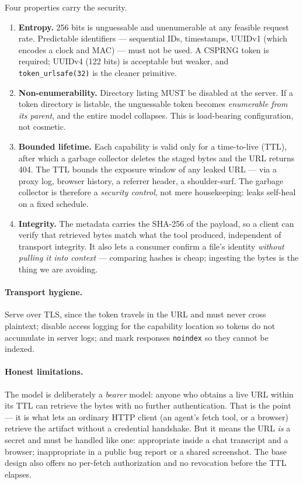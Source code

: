 \documentclass[11pt]{article}
\begin{document}
Four properties carry the security.
\begin{enumerate}
\item \textbf{Entropy.} 256 bits is unguessable and unenumerable at any feasible request rate. Predictable identifiers --- sequential IDs, timestamps, UUIDv1 (which encodes a clock and MAC) --- must not be used. A CSPRNG token is required; UUIDv4 (122 bits) is acceptable but weaker, and \texttt{token\_urlsafe(32)} is the cleaner primitive.
\item \textbf{Non-enumerability.} Directory listing MUST be disabled at the server. If a token directory is listable, the unguessable token becomes \emph{enumerable from its parent}, and the entire model collapses. This is load-bearing configuration, not cosmetic.
\item \textbf{Bounded lifetime.} Each capability is valid only for a time-to-live (TTL), after which a garbage collector deletes the staged bytes and the URL returns 404. The TTL bounds the exposure window of any leaked URL --- via a proxy log, browser history, a referrer header, a shoulder-surf. The garbage collector is therefore a \emph{security control}, not mere housekeeping: leaks self-heal on a fixed schedule.
\item \textbf{Integrity.} The metadata carries the SHA-256 of the payload, so a client can verify that retrieved bytes match what the tool produced, independent of transport integrity. It also lets a consumer confirm a file's identity \emph{without pulling it into context} --- comparing hashes is cheap; ingesting the bytes is the thing we are avoiding.
\end{enumerate}

\paragraph{Transport hygiene.} Serve over TLS, since the token travels in the URL and must never cross plaintext; disable access logging for the capability location so tokens do not accumulate in server logs; and mark responses \texttt{noindex} so they cannot be indexed.

\paragraph{Honest limitations.} The model is deliberately a \emph{bearer} model: anyone who obtains a live URL within its TTL can retrieve the bytes with no further authentication. That is the point --- it is what lets an ordinary HTTP client (an agent's fetch tool, or a browser) retrieve the artifact without a credential handshake. But it means the URL \emph{is} a secret and must be handled like one: appropriate inside a chat transcript and a browser; inappropriate in a public bug report or a shared screenshot. The base design also offers no per-fetch authorization and no revocation before the TTL elapses.
\end{document}
